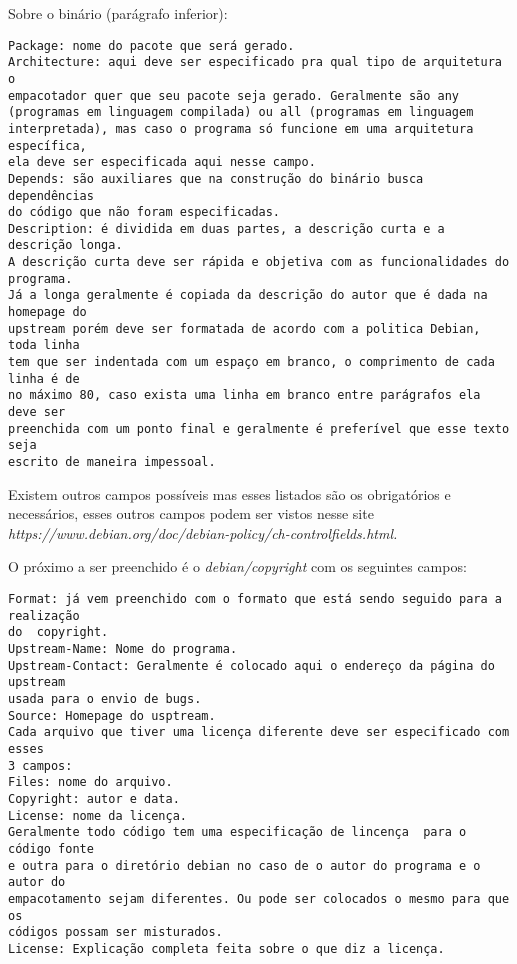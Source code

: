 Sobre o binário (parágrafo inferior):
\begin{verbatim}
Package: nome do pacote que será gerado.
Architecture: aqui deve ser especificado pra qual tipo de arquitetura o 
empacotador quer que seu pacote seja gerado. Geralmente são any 
(programas em linguagem compilada) ou all (programas em linguagem 
interpretada), mas caso o programa só funcione em uma arquitetura específica,
ela deve ser especificada aqui nesse campo.
Depends: são auxiliares que na construção do binário busca dependências
do código que não foram especificadas. 
Description: é dividida em duas partes, a descrição curta e a descrição longa.
A descrição curta deve ser rápida e objetiva com as funcionalidades do programa.
Já a longa geralmente é copiada da descrição do autor que é dada na homepage do
upstream porém deve ser formatada de acordo com a politica Debian, toda linha 
tem que ser indentada com um espaço em branco, o comprimento de cada linha é de
no máximo 80, caso exista uma linha em branco entre parágrafos ela deve ser
preenchida com um ponto final e geralmente é preferível que esse texto seja
escrito de maneira impessoal.
\end{verbatim}

Existem outros campos possíveis mas esses listados são os obrigatórios e necessários, esses outros campos podem ser vistos nesse site \textit{https://www.debian.org/doc/debian-policy/ch-controlfields.html. }

O próximo a ser preenchido é o \textit{debian/copyright} com os seguintes campos:
\begin{verbatim}
Format: já vem preenchido com o formato que está sendo seguido para a realização
do  copyright.
Upstream-Name: Nome do programa.
Upstream-Contact: Geralmente é colocado aqui o endereço da página do upstream
usada para o envio de bugs.
Source: Homepage do usptream.
Cada arquivo que tiver uma licença diferente deve ser especificado com esses
3 campos:
Files: nome do arquivo.
Copyright: autor e data.
License: nome da licença.
Geralmente todo código tem uma especificação de lincença  para o código fonte
e outra para o diretório debian no caso de o autor do programa e o autor do
empacotamento sejam diferentes. Ou pode ser colocados o mesmo para que os 
códigos possam ser misturados.
License: Explicação completa feita sobre o que diz a licença. 
\end{verbatim}

